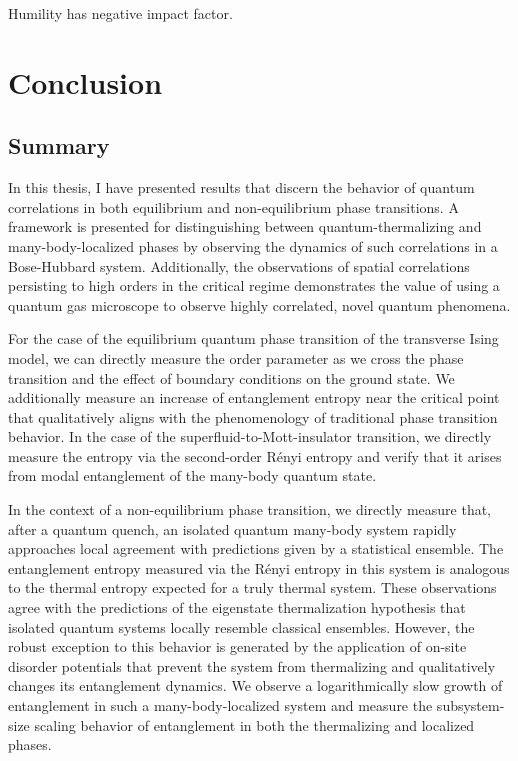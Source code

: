 %
\begin{savequote}[75mm]
Humility has negative impact factor.
\end{savequote}

\chapter{Conclusion}
\label{sec:conclusion}

\section{Summary}

In this thesis, I have presented results that discern the behavior of quantum correlations in both equilibrium and non-equilibrium phase transitions. A framework is presented for distinguishing between quantum-thermalizing and many-body-localized phases by observing the dynamics of such correlations in a Bose-Hubbard system. Additionally, the observations of spatial correlations persisting to high orders in the critical regime demonstrates  the value of using a quantum gas microscope to observe highly correlated, novel quantum phenomena. 

For the case of the equilibrium quantum phase transition of the transverse Ising model, we can directly measure the order parameter as we cross the phase transition and the effect of boundary conditions on the ground state. We additionally measure an increase of entanglement entropy near the critical point that qualitatively aligns with the phenomenology of traditional phase transition behavior\cite{Sachdev2011}. In the case of the superfluid-to-Mott-insulator transition, we directly measure the entropy via the second-order R\'enyi entropy and verify that it arises from modal entanglement of the many-body quantum state\cite{Islam2015}.

In the context of a non-equilibrium phase transition, we directly measure that, after a quantum quench, an isolated quantum many-body system rapidly approaches local agreement with predictions given by a statistical ensemble. The entanglement entropy measured via the R\'enyi entropy in this system is analogous to the thermal entropy expected for a truly thermal system. These observations agree with the predictions of the eigenstate thermalization hypothesis that isolated quantum systems locally resemble classical ensembles\cite{Kaufman2016}. However, the robust exception to this behavior is generated by the application of on-site disorder potentials that prevent the system from thermalizing and qualitatively changes its entanglement dynamics. We observe a logarithmically slow growth of entanglement in such a many-body-localized system and measure the subsystem-size scaling behavior of entanglement in both the thermalizing and localized phases\cite{Lukin2019}.

